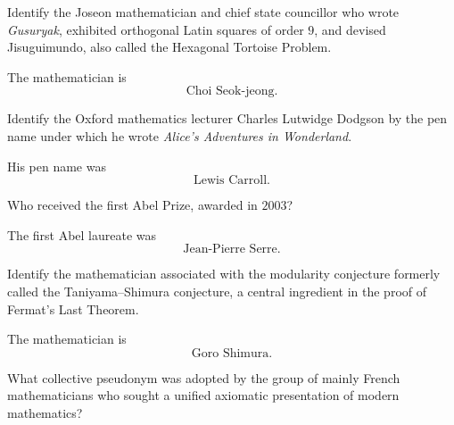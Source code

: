     \begin{expectedproblem}
        Identify the Joseon mathematician and chief state councillor who wrote
        \textit{Gusuryak}, exhibited orthogonal Latin squares of order $9$, and
        devised Jisuguimundo, also called the Hexagonal Tortoise Problem.
    \end{expectedproblem}

    \begin{solution}
        The mathematician is
        \[
            \boxed{\text{Choi Seok-jeong}}.
        \]
    \end{solution}

    \begin{expectedproblem}
        Identify the Oxford mathematics lecturer Charles Lutwidge Dodgson by the
        pen name under which he wrote
        \textit{Alice's Adventures in Wonderland}.
    \end{expectedproblem}

    \begin{solution}
        His pen name was
        \[
            \boxed{\text{Lewis Carroll}}.
        \]
    \end{solution}

    \begin{expectedproblem}
        Who received the first Abel Prize, awarded in $2003$?
    \end{expectedproblem}

    \begin{solution}
        The first Abel laureate was
        \[
            \boxed{\text{Jean-Pierre Serre}}.
        \]
    \end{solution}

    \begin{expectedproblem}
        Identify the mathematician associated with the modularity conjecture
        formerly called the Taniyama--Shimura conjecture, a central ingredient
        in the proof of Fermat's Last Theorem.
    \end{expectedproblem}

    \begin{solution}
        The mathematician is
        \[
            \boxed{\text{Goro Shimura}}.
        \]
    \end{solution}

    \begin{expectedproblem}
        What collective pseudonym was adopted by the group of mainly French
        mathematicians who sought a unified axiomatic presentation of modern
        mathematics?
    \end{expectedproblem}

